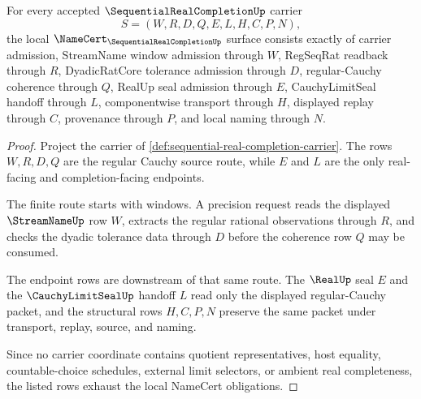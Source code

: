 \begin{theorem}
\label{thm:sequential-real-completion-namecert-obligations}
For every accepted $\SequentialRealCompletionUp$ carrier
$$
S=(W,R,D,Q,E,L,H,C,P,N),
$$
the local $\NameCert_{\SequentialRealCompletionUp}$ surface consists exactly of carrier admission, StreamName window admission through $W$, RegSeqRat readback through $R$, DyadicRatCore tolerance admission through $D$, regular-Cauchy coherence through $Q$, RealUp seal admission through $E$, CauchyLimitSeal handoff through $L$, componentwise transport through $H$, displayed replay through $C$, provenance through $P$, and local naming through $N$.
\end{theorem}
\begin{proof}
Project the carrier of \autoref{def:sequential-real-completion-carrier}. The rows $W,R,D,Q$ are the regular Cauchy source route, while $E$ and $L$ are the only real-facing and completion-facing endpoints.

The finite route starts with windows. A precision request reads the displayed $\StreamNameUp$ row $W$, extracts the regular rational observations through $R$, and checks the dyadic tolerance data through $D$ before the coherence row $Q$ may be consumed.

The endpoint rows are downstream of that same route. The $\RealUp$ seal $E$ and the $\CauchyLimitSealUp$ handoff $L$ read only the displayed regular-Cauchy packet, and the structural rows $H,C,P,N$ preserve the same packet under transport, replay, source, and naming.

Since no carrier coordinate contains quotient representatives, host equality, countable-choice schedules, external limit selectors, or ambient real completeness, the listed rows exhaust the local NameCert obligations.
\end{proof}

